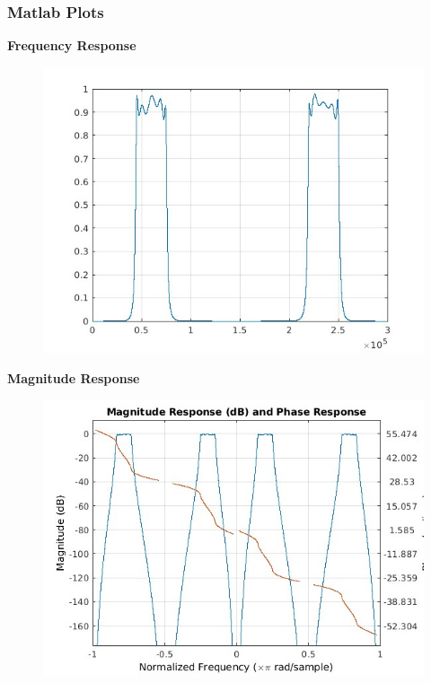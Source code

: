 \documentclass{article}
\begin{document}
\subsubsection{Matlab Plots}
\textbf{Frequency Response}
\begin{figure}[H]
\hspace*{-2.5cm}
    \centering
    \includegraphics[scale = 0.5]{multiband_cheby_mag.jpg}
    \label{fig:my_label}
\end{figure}

\textbf{Magnitude Response}


\begin{figure}[H]
        \hspace*{-2.5cm}
        \centering
        \includegraphics[scale = 0.5]{multiband_cheby_magphase.jpg}
        \caption{}\label{fig:my_label1} %

    \end{figure}
    
\end{document}
